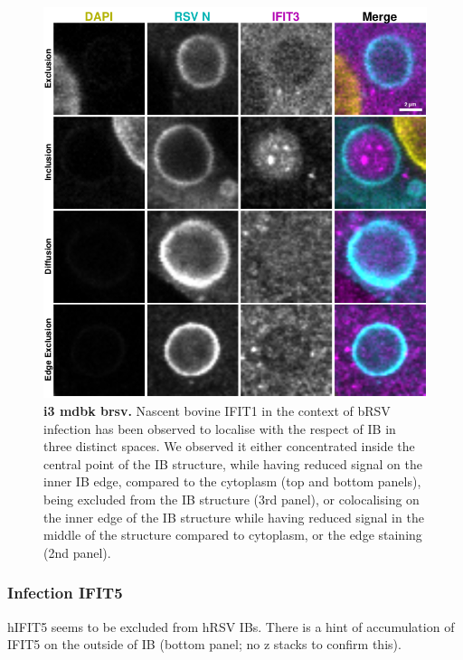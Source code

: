 \begin{figure}
    \centering
    \includegraphics[width=1\linewidth]{09. Chapter 4/Figs/02. Infection/02. IFIT3/09. mdbk i3.pdf}
    \caption[i3 mdbk brsv]{\textbf{i3 mdbk brsv.} Nascent bovine IFIT1 in the context of bRSV infection has been observed to localise with the respect of IB in three distinct spaces. We observed it either concentrated inside the central point of the IB structure, while having reduced signal on the inner IB edge, compared to the cytoplasm (top and bottom panels), being excluded from the IB structure (3rd panel), or colocalising on the inner edge of the IB structure while having reduced signal in the middle of the structure compared to cytoplasm, or the edge staining (2nd panel).}
    \label{fig:i3 mdbk brsv}
\end{figure}

\subsubsection{Infection IFIT5}
hIFIT5 seems to be excluded from hRSV IBs. There is a hint of accumulation of IFIT5 on the outside of IB (bottom panel; no z stacks to confirm this). 

